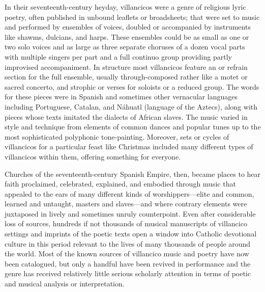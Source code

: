 In their seventeenth-century heyday, villancicos were a genre of religious
lyric poetry, often published in unbound leaflets or broadsheets; that
were set to music and performed by ensembles of voices, doubled or accompanied
by instruments like shawms, dulcians, and harps.
These ensembles could be as small as one or two solo voices and as large as
three separate choruses of a dozen vocal parts with multiple singers per part
and a full continuo group providing partly improvised accompaniment.
In structure most villancicos feature an  or refrain section
for the full ensemble, usually through-composed rather like a motet or sacred
concerto, and strophic  or verses for soloists or a reduced group.
The words for these pieces were in Spanish and sometimes other vernacular
languages including Portuguese, Catalan, and Náhuatl (language of the Aztecs),
along with pieces whose texts imitated the dialects of African slaves.
The music varied in style and technique from elements of common dances
and popular tunes up to the most sophisticated polyphonic tone-painting.
Moreover, sets or cycles of villancicos for a particular feast like Christmas
included many different types of villancicos within them, offering something
for everyone.

Churches of the seventeenth-century Spanish Empire, then, became places to hear
faith proclaimed, celebrated, explained, and embodied through music that
appealed to the ears of many different kinds of worshippers---elite and common,
learned and untaught, masters and slaves---and where contrary elements were
juxtaposed in lively and sometimes unruly counterpoint.
Even after considerable loss of sources, hundreds if not thousands of musical
manuscripts of villancico settings and imprints of the poetic texts open a
window into Catholic devotional culture in this period relevant to the lives of
many thousands of people around the world.
Most of the known sources of villancico music and poetry have now been
catalogued, but only a handful have been revived in performance and the
genre has received relatively little serious scholarly attention in terms of
poetic and musical analysis or interpretation.


